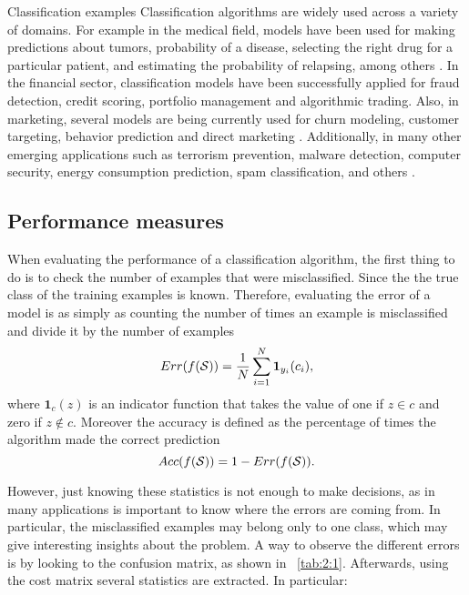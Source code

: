 \begin{remark}{Classification examples}
Classification algorithms are widely used across a variety of domains. For example in the 
medical field, models have been used for making predictions about tumors, probability 
of a disease, selecting the right drug for a particular patient, and estimating the probability of 
relapsing, among others \citep{Herland2014}. In the financial sector, classification models have 
been successfully applied for fraud detection, credit scoring, portfolio management and algorithmic 
trading. Also, in marketing, several models are being currently used for churn modeling, customer 
targeting, behavior prediction and direct marketing \citep{Baesens2014}. Additionally, in many 
other emerging applications such as terrorism prevention, malware detection, computer security, 
energy consumption prediction, spam classification, and others \citep{Kriegel2007}.
\end{remark}


\subsection{Performance measures}

When evaluating the performance of a classification algorithm, the first thing to do is to check 
the number of examples that were misclassified. Since the the true class of the training examples 
is known. Therefore, evaluating the error of a model is as simply as counting the number of times 
an example is misclassified and divide it by the number of examples
\begin{equation}\label{eqn:ch2:error}
Err(f({\cal S})) = \frac{1}{N}  \sum_{i=1}^N \mathbf{1}_{y_i}(c_i),
\end{equation}
where $\mathbf{1}_c(z)$ is an indicator function that takes the value of one if $z \in c$ and 
zero if $z \notin c$. Moreover the accuracy is defined as the percentage of times the algorithm 
made the correct prediction
\begin{equation}\label{eqn:2:accuracy}
Acc(f({\cal S})) = 1- Err(f({\cal S})).
\end{equation}

However, just knowing these statistics is not enough to make decisions, as in many applications is 
important to know where the errors are coming from. In particular, the misclassified examples may 
belong only to one class, which may give interesting insights about the problem. A way to observe 
the different errors is by looking to the confusion matrix, as shown in \tablename{~\ref{tab:2:1}}. 
Afterwards, using the cost matrix several statistics are extracted. In particular:

